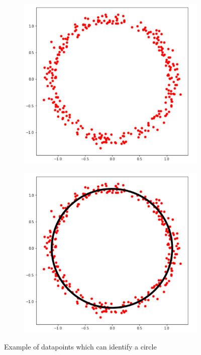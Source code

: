 \begin{figure}[h]
    \centering
    \begin{subfigure}[b]{0.49\linewidth}
        \includegraphics[width=\linewidth]{fig/kmeans/kmeans_circle.png}
    \end{subfigure}
    \begin{subfigure}[b]{0.49\linewidth}
        \includegraphics[width=\linewidth]{fig/kmeans/kmeans_circle copy.png}
    \end{subfigure}
    \caption{Example of datapoints which can identify a circle~\cite{DensityE3:online}}\label{fig:kmeans_circle}
\end{figure}


